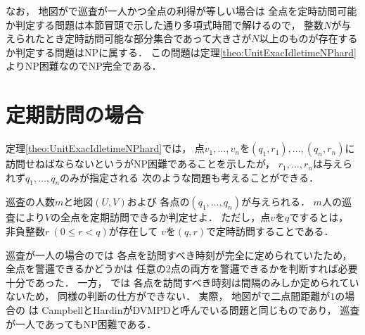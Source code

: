 なお，
地図が{\graphUnit}で巡査が一人かつ全点の利得が等しい場合は
全点を定時訪問可能か判定する問題は本節冒頭で示した通り多項式時間で解けるので，
整数$N$が与えられたとき定時訪問可能な部分集合であって大きさが$N$以上のものが存在するか判定する問題はNPに属する．
この問題は定理\ref{theo:UnitExacIdletimeNPhard}よりNP困難なのでNP完全である．




\section*{定期訪問の場合}

定理\ref{theo:UnitExacIdletimeNPhard}では，
点$v_1, \ldots, v_n$を{\exactTime}$(q_1, r_1), \ldots, (q_n, r_n)$に訪問せねばならないという{\timeSpecifiedPPProfit}がNP困難であることを示したが，
$r_1, \ldots, r_n$は与えられず$q_1, \ldots, q_n$のみが指定される
次のような問題も考えることができる．

\begin{intervalSpecifiedPatrollingProblem}
  巡査の人数$m$と地図$(U, V)$および
  各点の{\exactInterval}$(q_1, \ldots, q_n)$が与えられる．
  $m$人の巡査により$V$の全点を定期訪問できるか判定せよ．
  ただし，点$v$を$q$でするとは，
  非負整数$r\ (0 \leq r < q)$が存在して
  $v$を{\exactTime}$(q, r)$で定時訪問することである．
\end{intervalSpecifiedPatrollingProblem}

巡査が一人の場合の{\timeSpecifiedPP}では
各点を訪問すべき時刻が完全に定められていたため，
全点を警邏できるかどうかは
任意の2点の両方を警邏できるかを判断すれば必要十分であった．
一方，
{\intervalSpecifiedPP}では
各点を訪問すべき時刻は間隔のみしか定められていないため，
同様の判断の仕方ができない．
実際，
地図が{\graphUnit}で二点間距離が$1$の場合の
{\intervalSpecifiedPP}は
CampbellとHardin\cite{campbell2005vehicle}がDVMPDと呼んでいる問題と同じものであり，
巡査が一人であってもNP困難である\cite[Theorem~4]{campbell2005vehicle}．
